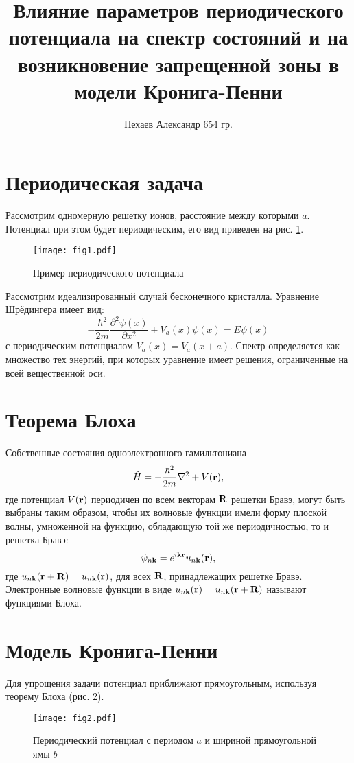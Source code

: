 \documentclass[a4paper, 12pt]{article}
\begin{document}
    \title{Влияние параметров периодического потенциала на спектр состояний и на возникновение запрещенной зоны в модели Кронига-Пенни}
    \author{Нехаев Александр 654 гр.}
    \maketitle
    \section{Периодическая задача}
    Рассмотрим одномерную решетку ионов, расстояние между которыми $a$. Потенциал при этом будет периодическим, его вид приведен на рис. \ref{fig:one}.
    \begin{figure}[h]
        \centering
        \texttt{[image: fig1.pdf]}
        \caption{Пример периодического потенциала}
        \label{fig:one}
    \end{figure}

    Рассмотрим идеализированный случай бесконечного кристалла. Уравнение Шрёдингера имеет вид:
    \begin{equation}
        -\frac{\hbar^2}{2m}\frac{\partial^2\psi(x)}{\partial x^2}+V_a(x)\psi(x)=E\psi(x)
    \end{equation}
    с периодическим потенциалом $V_a(x)=V_a(x+a)$. Спектр определяется как множество тех энергий, при которых уравнение имеет решения, ограниченные на всей вещественной оси.
    \section{Теорема Блоха}
    Собственные состояния одноэлектронного гамильтониана
    \begin{equation}
        \hat{H}=-\frac{\hbar^2}{2m}\nabla^2+V(\bf{r}),
    \end{equation}
    где потенциал $V(\bf{r})$ периодичен по всем векторам $\bf{R}$ решетки Бравэ, могут быть выбраны таким образом, чтобы их волновые функции имели форму плоской волны, умноженной на функцию, обладающую той же периодичностью, то и решетка Бравэ:
    \begin{equation}
        \psi_{n\bf{k}}=e^{i\bf{kr}}u_{n\bf{k}}(\bf{r}),
    \end{equation}
    где $u_{n\bf{k}}({\bf{r}+\bf{R}})=u_{n\bf{k}}(\bf{r})$, для всех $\bf{R}$, принадлежащих решетке Бравэ. Электронные волновые функции в виде $u_{n\bf{k}}({\bf{r}})=u_{n{\bf{k}}}(\bf{r+R})$ называют функциями Блоха.
    \section{Модель Кронига-Пенни}
    Для упрощения задачи потенциал приближают прямоугольным, используя теорему Блоха (рис. \ref{fig:two}).
    \begin{figure}[h]
        \centering
        \texttt{[image: fig2.pdf]}
        \caption{Периодический потенциал с периодом $a$ и шириной прямоугольной ямы $b$}
        \label{fig:two}
    \end{figure}
\end{document}
